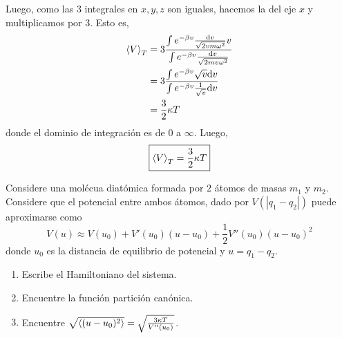 \begin{sol}
Luego, como las $3$ integrales en $x,y,z$ son iguales, hacemos la del eje $x$ y multiplicamos por $3$. Esto es,
\begin{align}
  \ev{V}_T&=3\frac{\int e^{-\b v}\frac{\dd v}{\sqrt{2vm\omega^2}}v}{\int e^{-\b v}\frac{\dd v}{\sqrt{2mv\omega^2}}}\\
  &=3\frac{\int e^{-\b v}\sqrt{v}\dd v}{\int e^{-\b v}\frac{1}{\sqrt{v}}\dd v}\\
  &=\frac{3}{2}\k T
\end{align}
donde el dominio de integración es de $0$ a $\infty$. Luego,
\begin{equation}
  \boxed{\ev{V}_T=\frac{3}{2}\k T}
\end{equation}








\end{sol}


\begin{ej}
	Considere una molécua diatómica formada por $2$ átomos de masas $m_1$ y $m_2$. Considere que el potencial entre ambos átomos, dado por $V(|q_1-q_2|)$ puede aproximarse como
	\begin{equation}
  V(u)\approx V(u_0)+V'(u_0)(u-u_0)+\frac{1}{2}V''(u_0)(u-u_0)^2
\end{equation}
donde $u_0$ es la distancia de equilibrio de potencial y $u=q_1-q_2$.
\begin{enumerate}
	\item Escribe el Hamiltoniano del sistema.
	\item Encuentre la función partición canónica.
	\item Encuentre $\sqrt{\ev{(u-u_0)^2}}=\sqrt{\frac{3\k T}{V''(u_0)}}$.
\end{enumerate}
\end{ej}


